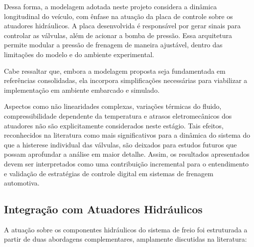 Dessa forma, a modelagem adotada neste projeto considera a dinâmica longitudinal do veículo, com ênfase na atuação da placa de controle sobre os atuadores hidráulicos. A placa desenvolvida é responsável por gerar sinais para controlar as válvulas, além de acionar a bomba de pressão. Essa arquitetura permite modular a pressão de frenagem de maneira ajustável, dentro das limitações do modelo e do ambiente experimental.

Cabe ressaltar que, embora a modelagem proposta seja fundamentada em referências consolidadas, ela incorpora simplificações necessárias para viabilizar a implementação em ambiente embarcado e simulado.  Aspectos como não linearidades complexas, variações térmicas do fluido, compressibilidade dependente da temperatura e atrasos eletromecânicos dos atuadores não são explicitamente considerados neste estágio. Tais efeitos, reconhecidos na literatura como mais significativos para a dinâmica do sistema do que a histerese individual das válvulas, são deixados para estudos futuros que possam aprofundar a análise em maior detalhe. Assim, os resultados apresentados devem ser interpretados como uma contribuição incremental para o entendimento e validação de estratégias de controle digital em sistemas de frenagem automotiva.


\subsection{Integração com Atuadores Hidráulicos}
\label{sec:controle-4-1-1}

A atuação sobre os componentes hidráulicos do sistema de freio foi estruturada a partir de duas abordagens complementares, amplamente discutidas na literatura:

